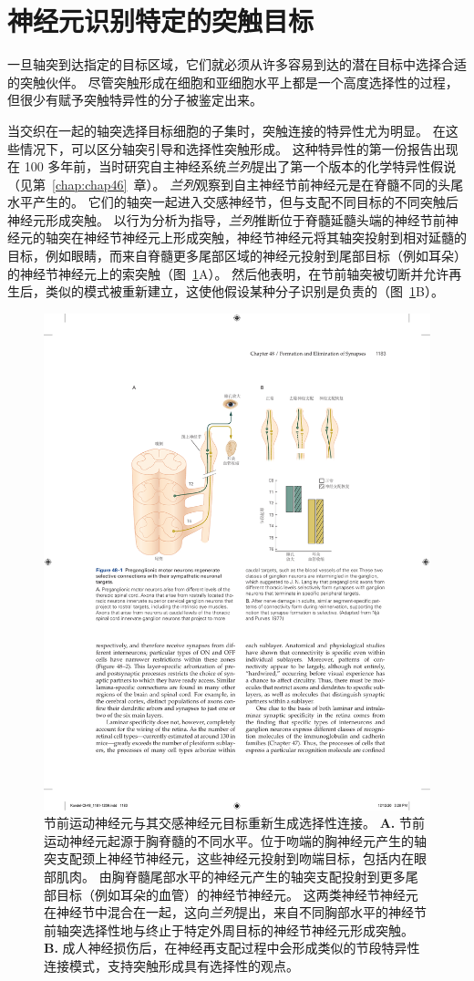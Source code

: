 \section{神经元识别特定的突触目标}

一旦轴突到达指定的目标区域，它们就必须从许多容易到达的潜在目标中选择合适的突触伙伴。
尽管突触形成在细胞和亚细胞水平上都是一个高度选择性的过程，但很少有赋予突触特异性的分子被鉴定出来。


当交织在一起的轴突选择目标细胞的子集时，突触连接的特异性尤为明显。
在这些情况下，可以区分轴突引导和选择性突触形成。
这种特异性的第一份报告出现在 100 多年前，当时研究自主神经系统\textit{兰列}提出了第一个版本的化学特异性假说（见第~\ref{chap:chap46}~章）。
\textit{兰列}观察到自主神经节前神经元是在脊髓不同的头尾水平产生的。
它们的轴突一起进入交感神经节，但与支配不同目标的不同突触后神经元形成突触。
以行为分析为指导，\textit{兰列}推断位于脊髓延髓头端的神经节前神经元的轴突在神经节神经元上形成突触，神经节神经元将其轴突投射到相对延髓的目标，例如眼睛，而来自脊髓更多尾部区域的神经元投射到尾部目标（例如耳朵）的神经节神经元上的索突触（图~\ref{fig:48_1}A）。
然后他表明，在节前轴突被切断并允许再生后，类似的模式被重新建立，这使他假设某种分子识别是负责的（图~\ref{fig:48_1}B）。


\begin{figure}[htbp]
	\centering
	\includegraphics[width=0.8\linewidth]{chap48/fig_48_1}
	\caption{节前运动神经元与其交感神经元目标重新生成选择性连接。
		\textbf{A.} 节前运动神经元起源于胸脊髓的不同水平。位于吻端的胸神经元产生的轴突支配颈上神经节神经元，这些神经元投射到吻端目标，包括内在眼部肌肉。
		由胸脊髓尾部水平的神经元产生的轴突支配投射到更多尾部目标（例如耳朵的血管）的神经节神经元。
		这两类神经节神经元在神经节中混合在一起，这向\textit{兰列}提出，来自不同胸部水平的神经节前轴突选择性地与终止于特定外周目标的神经节神经元形成突触。
		\textbf{B.} 成人神经损伤后，在神经再支配过程中会形成类似的节段特异性连接模式，支持突触形成具有选择性的观点\cite{njaa1977specific}。}
	\label{fig:48_1}
\end{figure}


